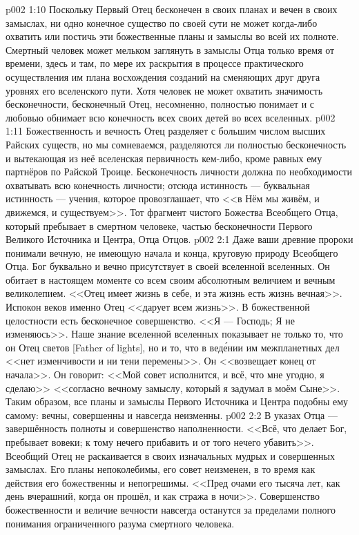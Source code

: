\vs p002 1:10 \pc Поскольку Первый Отец бесконечен в своих планах и вечен в своих замыслах, ни одно конечное существо по своей сути не может когда\hyp{}либо охватить или постичь эти божественные планы и замыслы во всей их полноте. Смертный человек может мельком заглянуть в замыслы Отца только время от времени, здесь и там, по мере их раскрытия в процессе практического осуществления им плана восхождения созданий на сменяющих друг друга уровнях его вселенского пути. Хотя человек не может охватить значимость бесконечности, бесконечный Отец, несомненно, полностью понимает и с любовью обнимает всю конечность всех своих детей во всех вселенных.
\vs p002 1:11 Божественность и вечность Отец разделяет с большим числом высших Райских существ, но мы сомневаемся, разделяются ли полностью бесконечность и вытекающая из неё вселенская первичность кем\hyp{}либо, кроме равных ему партнёров по Райской Троице. Бесконечность личности должна по необходимости охватывать всю конечность личности; отсюда истинность --- буквальная истинность --- учения, которое провозглашает, что <<в Нём мы живём, и движемся, и существуем>>. Тот фрагмент чистого Божества Всеобщего Отца, который пребывает в смертном человеке,  частью бесконечности Первого Великого Источника и Центра, Отца Отцов.
\vs p002 2:1 Даже ваши древние пророки понимали вечную, не имеющую начала и конца, круговую природу Всеобщего Отца. Бог буквально и вечно присутствует в своей вселенной вселенных. Он обитает в настоящем моменте со всем своим абсолютным величием и вечным великолепием. <<Отец имеет жизнь в себе, и эта жизнь есть жизнь вечная>>. Испокон веков именно Отец <<дарует всем жизнь>>. В божественной целостности есть бесконечное совершенство. <<Я --- Господь; Я не изменяюсь>>. Наше знание вселенной вселенных показывает не только то, что он Отец светов [Father of lights], но и то, что в вед\'ении им межпланетных дел <<нет изменчивости и ни тени перемены>>. Он <<возвещает конец от начала>>. Он говорит: <<Мой совет исполнится, и всё, что мне угодно, я сделаю>> <<согласно вечному замыслу, который я задумал в моём Сыне>>. Таким образом, все планы и замыслы Первого Источника и Центра подобны ему самому: вечны, совершенны и навсегда неизменны.
\vs p002 2:2 В указах Отца --- завершённость полноты и совершенство наполненности. <<Всё, что делает Бог, пребывает вовеки; к тому нечего прибавить и от того нечего убавить>>. Всеобщий Отец не раскаивается в своих изначальных мудрых и совершенных замыслах. Его планы непоколебимы, его совет неизменен, в то время как действия его божественны и непогрешимы. <<Пред очами его тысяча лет, как день вчерашний, когда он прошёл, и как стража в ночи>>. Совершенство божественности и величие вечности навсегда останутся за пределами полного понимания ограниченного разума смертного человека.

